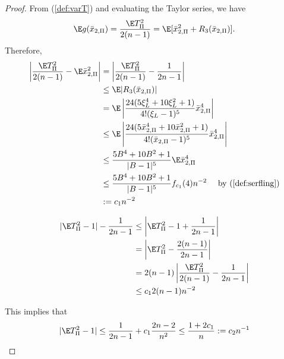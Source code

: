 \begin{proof}
  From (\ref{def:varT}) and evaluating the Taylor series, we have
  \begin{equation*}
    \E g(\bar{x}_{2,\Pi}) = \frac{\E T_{\Pi}^2}{2(n-1)} = \E[\bar{x}_{2,\Pi}^2 + R_3(\bar{x}_{2,\Pi})].
  \end{equation*}
  Therefore,
  \begin{align*}
    \left | \frac{\E T_{\Pi}^2}{2(n-1)} - \E \bar{x}_{2,\Pi}^2 \right |
    &= \left | \frac{\E T_{\Pi}^2}{2(n-1)} - \frac{1}{2n-1} \right | \\
    &\leq  \E |R_3(\bar{x}_{2,\Pi})| \\
    &= \E \left | \frac{24(5\xi_L^4 + 10 \xi_L^2 +
        1)}{4!(\xi_L-1)^5}\bar{x}_{2,\Pi}^4 \right | \\
    &\leq \E \left | \frac{24(5\bar{x}_{2,\Pi}^4 + 10 \bar{x}_{2,\Pi}^2 +
        1)}{4!(\bar{x}_{2,\Pi}-1)^5}\bar{x}_{2,\Pi}^4 \right | \\
    &\leq \frac{5B^4+10B^2+1}{|B-1|^5} \E \bar{x}_{2,\Pi}^4 \\
    &\leq \frac{5B^4+10B^2+1}{|B-1|^5} f_{c_1}(4) n^{-2} \quad \text{
      by } (\ref{def:serfling}) \\
    &:= c_1 n^{-2}
  \end{align*}

  \begin{align*}
    |\E T_{\Pi}^2 - 1| - \frac{1}{2n-1}
    &\leq \left | \E T_{\Pi}^2 - 1 + \frac{1}{2n-1} \right | \\
    &= \left | \E T_{\Pi}^2 - \frac{2(n-1)}{2n-1} \right | \\
    &= 2(n-1) \left | \frac{\E T_{\Pi}^2}{2(n-1)} - \frac{1}{2n-1} \right | \\
    &\leq c_1 2(n-1)n^{-2}
  \end{align*}

  This implies that
  \begin{equation*}
    |\E T_{\Pi}^2 - 1| \leq \frac{1}{2n-1} + c_1 \frac{2n-2}{n^2} \leq
    \frac{1 + 2c_1}{n} := c_2 n^{-1}
  \end{equation*}
\end{proof}

